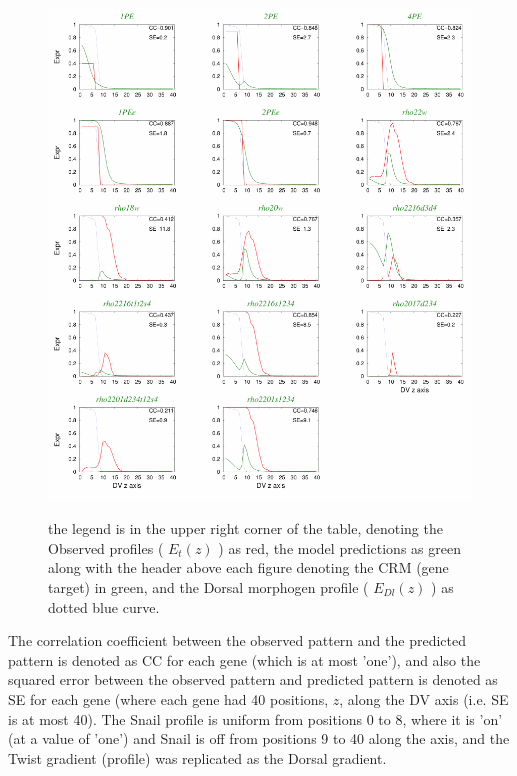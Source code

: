 \begin{figure}
  \includegraphics[width=1\textwidth]{DIb.pdf}\\
  \caption{the legend is in the upper right corner of the table, denoting the Observed profiles ( $E_t(z)$ ) as red, the model predictions as green along with the header above each figure denoting the CRM (gene target) in green, and the Dorsal morphogen profile  ( $E_{Dl}(z)$ ) as dotted blue curve. }\label{roughfit}
\end{figure}
  The correlation coefficient between the observed pattern and the predicted pattern is denoted as CC for each gene (which is at most 'one'), and also the squared error between the observed pattern and predicted pattern is denoted as SE for each gene (where each gene had 40 positions, $z$, along the DV axis (i.e. SE is at most 40).  The Snail profile is uniform from positions 0 to 8, where it is 'on' (at a value of 'one') and Snail is off from positions 9 to 40 along the axis, and the Twist gradient (profile) was replicated as the Dorsal gradient.
\newpage

